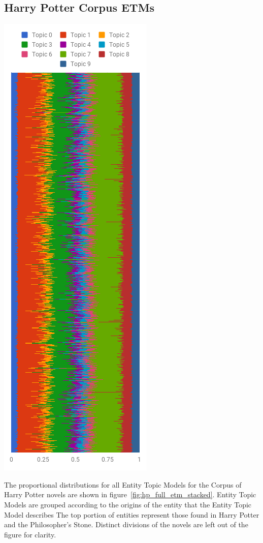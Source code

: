 \documentclass[10pt]{report}
\begin{document}
\subsection{Harry Potter Corpus ETMs}
\begin{multicols}{2}
  {\centering
  \includegraphics[scale=0.65]{hp_full_etm_stacked}
  }
  
\columnbreak
The proportional distributions for all Entity Topic Models for the Corpus of Harry Potter novels are shown in figure~\ref{fig:hp_full_etm_stacked}. Entity Topic Models are grouped according to the origins of the entity that the Entity Topic Model describes The top portion of entities represent those found in Harry Potter and the Philosopher's Stone. Distinct divisions of the novels are left out of the figure for clarity.


\end{multicols}
\end{document}
